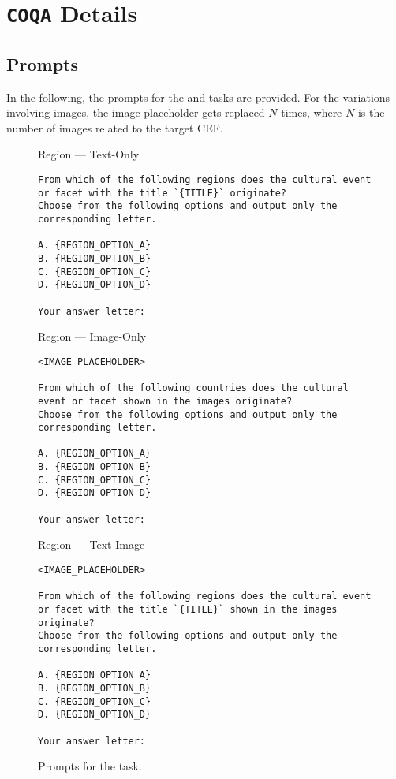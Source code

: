 \section{\texttt{COQA} Details}
\label{appendix:sec:coqa}
%

\subsection{Prompts}
\label{appendix:sec:coqa:prompts}
%
In the following, the prompts for the \coqar and \coqac tasks are provided.
%
For the variations involving images, the image placeholder gets replaced $N$ times, where $N$ is the number of images related to the target CEF.
%
\begin{figure*}[ht]
    \centering
    \begin{promptbox}{Region --- Text-Only}
    \begin{verbatim}
From which of the following regions does the cultural event or facet with the title `{TITLE}` originate?
Choose from the following options and output only the corresponding letter.

A. {REGION_OPTION_A}
B. {REGION_OPTION_B}
C. {REGION_OPTION_C}
D. {REGION_OPTION_D}

Your answer letter:
    \end{verbatim}
    \end{promptbox}
    \begin{promptbox}{Region --- Image-Only}
    \begin{verbatim}
<IMAGE_PLACEHOLDER>

From which of the following countries does the cultural event or facet shown in the images originate?
Choose from the following options and output only the corresponding letter.

A. {REGION_OPTION_A}
B. {REGION_OPTION_B}
C. {REGION_OPTION_C}
D. {REGION_OPTION_D}

Your answer letter:
    \end{verbatim}
    \end{promptbox}
    \begin{promptbox}{Region --- Text-Image}
    \begin{verbatim}
<IMAGE_PLACEHOLDER>

From which of the following regions does the cultural event or facet with the title `{TITLE}` shown in the images originate?
Choose from the following options and output only the corresponding letter.

A. {REGION_OPTION_A}
B. {REGION_OPTION_B}
C. {REGION_OPTION_C}
D. {REGION_OPTION_D}

Your answer letter:
    \end{verbatim}
    \end{promptbox}
    \label{fig:coqa:prompts_r}
    \caption{Prompts for the \coqar task.}
\end{figure*}
%

